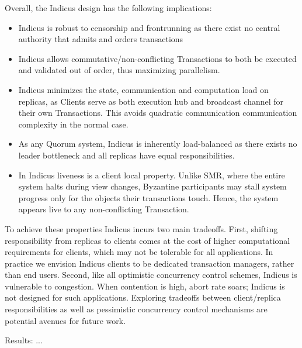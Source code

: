 

Overall, the Indicus design has the following implications:
\begin{itemize}%

\item Indicus is robust to censorship and frontrunning as there exist no central authority that admits and orders transactions
\item Indicus allows commutative/non-conflicting Transactions to both be executed and validated out of order, thus maximizing parallelism. 
\item Indicus minimizes the state, communication and computation load on replicas, as Clients serve as both execution hub and broadcast channel for their own Transactions. This avoids quadratic communication communication complexity in the normal case. 
\item As any Quorum system, Indicus is inherently load-balanced as there exists no leader bottleneck and all replicas have equal responsibilities.
\item In Indicus liveness is a client local property. Unlike SMR, where the entire system halts during view changes, Byzantine participants may stall system progress only for the objects their transactions touch. Hence, the system appears live to any non-conflicting Transaction.
\end{itemize}

To achieve these properties Indicus incurs two main tradeoffs. First, shifting responsibility from replicas to clients comes at the cost of higher computational requirements for clients, which may not be tolerable for all applications. In practice we envision Indicus clients to be dedicated transaction managers, rather than end users. Second, like all optimistic concurrency control schemes, Indicus is vulnerable to congestion. When contention is high, abort rate soars; Indicus is not designed for such applications. Exploring tradeoffs between client/replica responsibilities as well as pessimistic concurrency control mechanisms are potential avenues for future work.

Results:  ...

